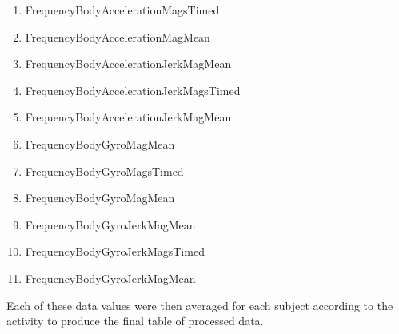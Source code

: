 \documentclass{article}
\begin{document}
\begin{enumerate}
	\item	FrequencyBodyAccelerationMagsTimed
	\item	FrequencyBodyAccelerationMagMean
	\item	FrequencyBodyAccelerationJerkMagMean
	\item	FrequencyBodyAccelerationJerkMagsTimed
	\item	FrequencyBodyAccelerationJerkMagMean
	\item	FrequencyBodyGyroMagMean
	\item	FrequencyBodyGyroMagsTimed
	\item	FrequencyBodyGyroMagMean
	\item	FrequencyBodyGyroJerkMagMean
	\item	FrequencyBodyGyroJerkMagsTimed
	\item	FrequencyBodyGyroJerkMagMean
\end{enumerate}

Each of these data values were then averaged for each subject according to the activity to produce the final table of processed data. 
\end{document}
